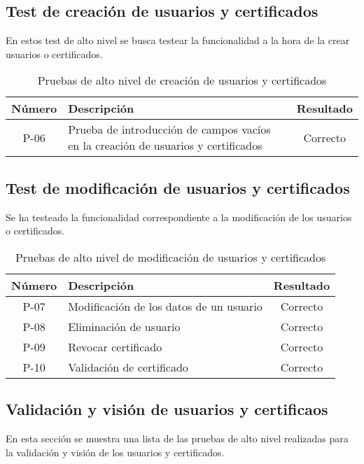 \subsection{Test de creación de usuarios y certificados}
En estos test de alto nivel se busca testear la funcionalidad a la hora de la crear usuarios o certificados.

\begin{table}[!h]
	\begin{center}
		\begin{tabular}{|c|p{6cm}|c|}
		\hline \textbf{Número} & \textbf{Descripción} & \textbf{Resultado}\\ 
		\hline P-06 & Prueba de introducción de campos vacíos en la creación de usuarios y certificados & Correcto \\
		\hline 
		\end{tabular}
		\caption{Pruebas de alto nivel de creación de usuarios y certificados}
		\label{tab:createTest}
	\end{center}
\end{table}

\subsection{Test de modificación de usuarios y certificados}
Se ha testeado la funcionalidad correspondiente a la modificación de los usuarios o certificados.

\begin{table}[!h]
	\begin{center}
		\begin{tabular}{|c|p{6cm}|c|}
				\hline \textbf{Número} & \textbf{Descripción} & \textbf{Resultado}\\ 
				\hline P-07 & Modificación de los datos de un usuario & Correcto \\
				\hline P-08 & Eliminación de usuario & Correcto \\
				\hline P-09 & Revocar certificado & Correcto \\
				\hline P-10 & Validación de certificado & Correcto \\
				\hline 
		\end{tabular}
		\caption{Pruebas de alto nivel de modificación de usuarios y certificados}
		\label{tab:modifyTest}
	\end{center}
\end{table}

\subsection{Validación y visión de usuarios y certificaos}
En esta sección se muestra una lista de las pruebas de alto nivel realizadas para la validación y visión de los usuarios y certificados.

